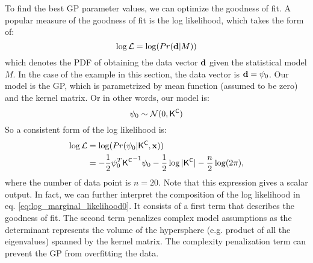 To find the best GP parameter values, we can optimize 
the goodness of fit. A popular measure of the goodness of fit is
the log likelihood, which takes the form of:
\begin{equation}
	\log \mathcal{L} = \log(Pr({\bf d} | M))
\end{equation}
which denotes the PDF of obtaining the data vector ${\bf d}$ given the
statistical model $M$. 
In the case of the example in this section, the data vector is ${\bf d} =
\psi_0$. Our model is the GP, which is parametrized by mean
function (assumed to be zero) and the kernel matrix. 
Or in other words, our model is:
\begin{equation}
	\psi_0 \sim \mathcal{N}(0, \mathsf{K}^{\mathsf{C}})
\end{equation}
So a consistent form of the log
likelihood is: \\
\begin{align}
	\log \mathcal{L} &= \log (Pr(\psi_0 | \mathsf{K}^{\mathsf{C}}, \mathbf{x}))\\
	&=  -\frac{1}{2}\psi_0^T {\mathsf{K}^{\mathsf{C}}}^{-1}\psi_0
	- \frac{1}{2}\log|\mathsf{K}^{\mathsf{C}}| - \frac{n}{2}\log(2\pi),
	\label{eq:log_marginal_likelihood0}
\end{align}
where the number of data point is $n=20$. Note that this expression gives a scalar output.
In fact, we can further interpret the composition of the log likelihood in 
eq. \ref{eq:log_marginal_likelihood0}. It
consists of a first term that describes the goodness of fit.
The second term penalizes complex model assumptions \citep{Rasmussen2006} 
as the determinant represents the volume of the hypersphere (e.g. product of
all the eigenvalues) spanned by the kernel matrix. 
The complexity penalization term can prevent the GP from overfitting the data.


